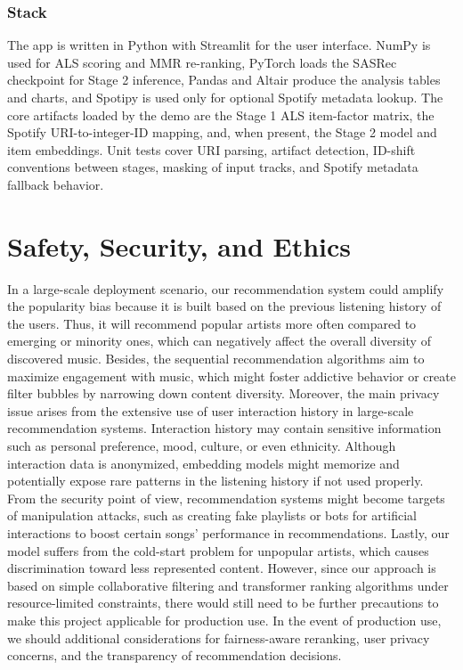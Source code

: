 \documentclass[11pt,a4paper]{article}
\begin{document}
\subsubsection{Stack}

The app is written in Python with Streamlit for the user interface. NumPy is
used for ALS scoring and MMR re-ranking, PyTorch loads the SASRec checkpoint for
Stage 2 inference, Pandas and Altair produce the analysis tables and charts, and
Spotipy is used only for optional Spotify metadata lookup. The core artifacts
loaded by the demo are the Stage 1 ALS item-factor matrix, the Spotify
URI-to-integer-ID mapping, and, when present, the Stage 2 model and item
embeddings. Unit tests cover URI parsing, artifact detection, ID-shift
conventions between stages, masking of input tracks, and Spotify metadata
fallback behavior.



\section{Safety, Security, and Ethics}

In a large-scale deployment scenario, our recommendation system could amplify the popularity bias because it is built based on the previous listening history of the users. Thus, it will recommend popular artists more often compared to emerging or minority ones, which can negatively affect the overall diversity of discovered music. Besides, the sequential recommendation algorithms aim to maximize engagement with music, which might foster addictive behavior or create filter bubbles by narrowing down content diversity. Moreover, the main privacy issue arises from the extensive use of user interaction history in large-scale recommendation systems. Interaction history may contain sensitive information such as personal preference, mood, culture, or even ethnicity. Although interaction data is anonymized, embedding models might memorize and potentially expose rare patterns in the listening history if not used properly. From the security point of view, recommendation systems might become targets of manipulation attacks, such as creating fake playlists or bots for artificial interactions to boost certain songs' performance in recommendations. Lastly, our model suffers from the cold-start problem for unpopular artists, which causes discrimination toward less represented content. However, since our approach is based on simple collaborative filtering and transformer ranking algorithms under resource-limited constraints, there would still need to be further precautions to make this project applicable for production use. In the event of production use, we should additional considerations for fairness-aware reranking, user privacy concerns, and the transparency of recommendation decisions.
\end{document}
